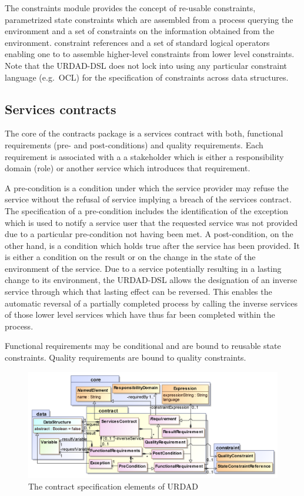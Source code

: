 The constraints module provides the concept of re-usable constraints, parametrized state constraints which are assembled from a process querying the environment and a set of constraints on the information obtained from the environment. constraint references and a set of standard logical operators enabling one to to assemble higher-level constraints from lower level constraints. Note that the URDAD-DSL does not lock into using any particular constraint language (e.g.\ OCL) for the specification of constraints across data structures.


\subsection{Services contracts}

The core of the contracts package is a services contract with both, functional requirements (pre- and post-conditions) and quality requirements. Each requirement is associated with a a stakeholder which is either a responsibility domain (role) or another service which introduces that requirement. 

A pre-condition is a condition under which the service provider may refuse the service without the refusal of service implying a breach of the services contract. The specification of a pre-condition includes the identification of the exception which is used to notify a service user that the requested service was not provided due to a particular pre-condition not having been met. A post-condition, on the other hand, is a condition which holds true after the service has been provided. It is either a condition on the result or on the change in the state of the environment of the service. Due to a service potentially resulting in a lasting change to its environment, the URDAD-DSL allows the designation of an inverse service through which that lasting effect can be reversed. This enables the automatic reversal of a partially completed process by calling the inverse services of those lower level services which have thus far been completed within the process.

Functional requirements may be conditional and are bound to reusable state constraints.  Quality requirements are bound to quality constraints.

\begin{figure}[Htbp]
  \centering
  \includegraphics{contract}
  \caption{The contract specification elements of URDAD}
  \label{fig:metamodel}
\end{figure}


